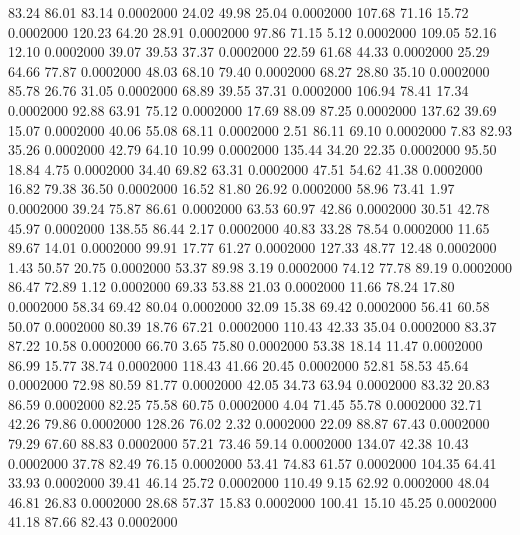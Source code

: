   83.24   86.01   83.14   0.0002000
  24.02   49.98   25.04   0.0002000
 107.68   71.16   15.72   0.0002000
 120.23   64.20   28.91   0.0002000
  97.86   71.15    5.12   0.0002000
 109.05   52.16   12.10   0.0002000
  39.07   39.53   37.37   0.0002000
  22.59   61.68   44.33   0.0002000
  25.29   64.66   77.87   0.0002000
  48.03   68.10   79.40   0.0002000
  68.27   28.80   35.10   0.0002000
  85.78   26.76   31.05   0.0002000
  68.89   39.55   37.31   0.0002000
 106.94   78.41   17.34   0.0002000
  92.88   63.91   75.12   0.0002000
  17.69   88.09   87.25   0.0002000
 137.62   39.69   15.07   0.0002000
  40.06   55.08   68.11   0.0002000
   2.51   86.11   69.10   0.0002000
   7.83   82.93   35.26   0.0002000
  42.79   64.10   10.99   0.0002000
 135.44   34.20   22.35   0.0002000
  95.50   18.84    4.75   0.0002000
  34.40   69.82   63.31   0.0002000
  47.51   54.62   41.38   0.0002000
  16.82   79.38   36.50   0.0002000
  16.52   81.80   26.92   0.0002000
  58.96   73.41    1.97   0.0002000
  39.24   75.87   86.61   0.0002000
  63.53   60.97   42.86   0.0002000
  30.51   42.78   45.97   0.0002000
 138.55   86.44    2.17   0.0002000
  40.83   33.28   78.54   0.0002000
  11.65   89.67   14.01   0.0002000
  99.91   17.77   61.27   0.0002000
 127.33   48.77   12.48   0.0002000
   1.43   50.57   20.75   0.0002000
  53.37   89.98    3.19   0.0002000
  74.12   77.78   89.19   0.0002000
  86.47   72.89    1.12   0.0002000
  69.33   53.88   21.03   0.0002000
  11.66   78.24   17.80   0.0002000
  58.34   69.42   80.04   0.0002000
  32.09   15.38   69.42   0.0002000
  56.41   60.58   50.07   0.0002000
  80.39   18.76   67.21   0.0002000
 110.43   42.33   35.04   0.0002000
  83.37   87.22   10.58   0.0002000
  66.70    3.65   75.80   0.0002000
  53.38   18.14   11.47   0.0002000
  86.99   15.77   38.74   0.0002000
 118.43   41.66   20.45   0.0002000
  52.81   58.53   45.64   0.0002000
  72.98   80.59   81.77   0.0002000
  42.05   34.73   63.94   0.0002000
  83.32   20.83   86.59   0.0002000
  82.25   75.58   60.75   0.0002000
   4.04   71.45   55.78   0.0002000
  32.71   42.26   79.86   0.0002000
 128.26   76.02    2.32   0.0002000
  22.09   88.87   67.43   0.0002000
  79.29   67.60   88.83   0.0002000
  57.21   73.46   59.14   0.0002000
 134.07   42.38   10.43   0.0002000
  37.78   82.49   76.15   0.0002000
  53.41   74.83   61.57   0.0002000
 104.35   64.41   33.93   0.0002000
  39.41   46.14   25.72   0.0002000
 110.49    9.15   62.92   0.0002000
  48.04   46.81   26.83   0.0002000
  28.68   57.37   15.83   0.0002000
 100.41   15.10   45.25   0.0002000
  41.18   87.66   82.43   0.0002000
